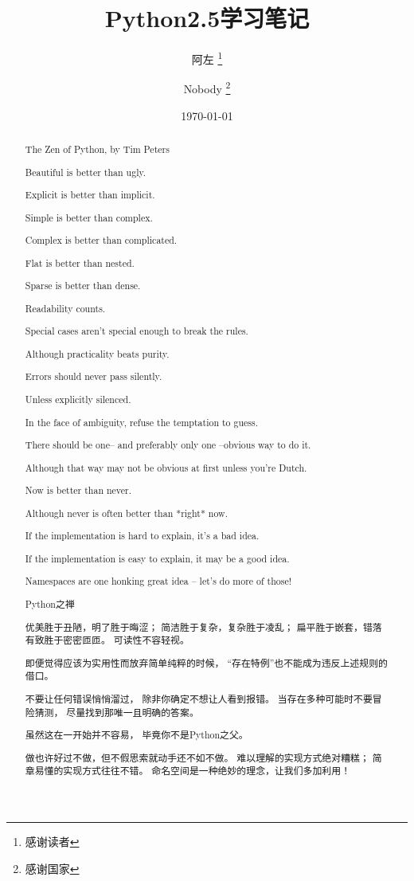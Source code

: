 \documentclass[10pt,a4paper]{report}
\title{Python2.5学习笔记}                             %
\author{                                     %
		阿左 \thanks{感谢读者} \and 
		Nobody \thanks{感谢国家}
	}
\date{\today}                                %
\begin{document}
	\maketitle                                   %
	\tableofcontents                             %
	\setcounter{tocdepth}{5}                     %
	\listoffigures                               %
	\listoftables                                %


	\begin{abstract}                             %
		The Zen of Python, by Tim Peters

		Beautiful is better than ugly.

		Explicit is better than implicit.

		Simple is better than complex.

		Complex is better than complicated.

		Flat is better than nested.

		Sparse is better than dense.

		Readability counts.

		Special cases aren't special enough to break the rules.

		Although practicality beats purity.

		Errors should never pass silently.

		Unless explicitly silenced.

		In the face of ambiguity, refuse the temptation to guess.

		There should be one-- and preferably only one --obvious way to do it.

		Although that way may not be obvious at first unless you're Dutch.

		Now is better than never.

		Although never is often better than *right* now.

		If the implementation is hard to explain, it's a bad idea.

		If the implementation is easy to explain, it may be a good idea.

		Namespaces are one honking great idea -- let's do more of those!
	\end{abstract}

	\renewcommand{\abstractname}{摘要}           %
	\begin{abstract}

		Python之禅

		优美胜于丑陋，明了胜于晦涩；
		简洁胜于复杂，复杂胜于凌乱；
		扁平胜于嵌套，错落有致胜于密密匝匝。
		可读性不容轻视。

		即便觉得应该为实用性而放弃简单纯粹的时候，
		“存在特例”也不能成为违反上述规则的借口。

		不要让任何错误悄悄溜过，
		除非你确定不想让人看到报错。
		当存在多种可能时不要冒险猜测，
		尽量找到那唯一且明确的答案。

		虽然这在一开始并不容易，
		毕竟你不是Python之父。

		做也许好过不做，但不假思索就动手还不如不做。
		难以理解的实现方式绝对糟糕；
		简章易懂的实现方式往往不错。
		命名空间是一种绝妙的理念，让我们多加利用！
	\end{abstract}
\end{document}
